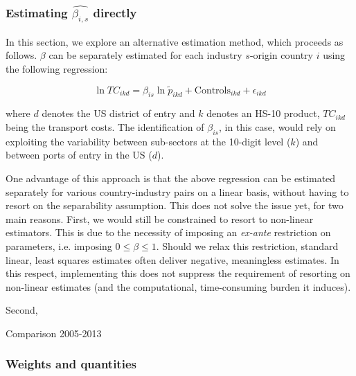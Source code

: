 \documentclass[11pt,twoside, authoryear]{elsarticle}
\begin{document}
\subsubsection{Estimating $\widehat{\beta_{i,s}}$ directly}
	
In this section, we explore an alternative estimation method, which proceeds as follows. $\beta$ can be separately estimated for each industry $s$-origin country $i$ using the following regression:

\begin{equation}
\ln TC_{ikd} = \beta_{is}\ln \tilde{p}_{ikd} + \text{Controls}_{ikd} +\epsilon_{ikd} \label{eq:estimation_ref1}
\end{equation}

where $d$ denotes the US district of entry and $k$ denotes an HS-10 product, $TC_{ikd}$ being the transport costs. The
identification of $\beta_{is}$, in this case, would rely on exploiting the variability between sub-sectors at the 10-digit
level ($k$) and between ports of entry in the US ($d$).

One advantage of this approach is that the above regression can be estimated separately for various country-industry pairs on a linear basis, without having to resort on the separability assumption. This does not solve the issue yet, for two main reasons. First, we would still be constrained to resort to non-linear estimators. This is due to the necessity of imposing an \textit{ex-ante} restriction on parameters, i.e. imposing $0 \leq  \beta \leq 1$. Should we relax this restriction, standard linear, least squares estimates often deliver negative, meaningless estimates. In this respect, implementing this does not suppress the requirement of resorting on non-linear estimates (and the computational, time-consuming burden it induces).

Second, 


\begin{table}[htbp]
	\caption{Comparison 2005-2013}
	\begin{center}		
		
	\end{center}
	\label{tab_comp_referee1_baseline}%
\end{table}%



\subsubsection{Weights and quantities}
\end{document}
